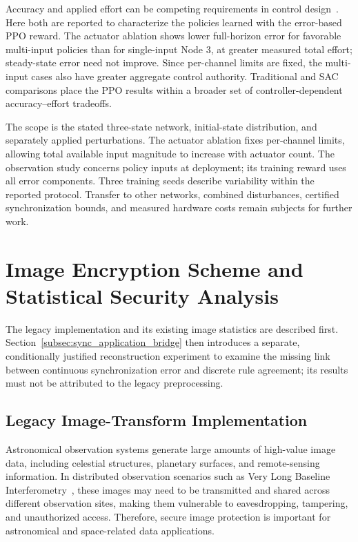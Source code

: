 \documentclass[a4paper,fleqn]{cas-sc}
\theoremstyle{plain}
\theoremstyle{definition}
\begin{document}
Accuracy and applied effort can be competing requirements in control design~\cite{rodriguez2020multiobjective}. Here both are reported to characterize the policies learned with the error-based PPO reward. The actuator ablation shows lower full-horizon error for favorable multi-input policies than for single-input Node 3, at greater measured total effort; steady-state error need not improve. Since per-channel limits are fixed, the multi-input cases also have greater aggregate control authority. Traditional and SAC comparisons place the PPO results within a broader set of controller-dependent accuracy--effort tradeoffs.

The scope is the stated three-state network, initial-state distribution, and separately applied perturbations. The actuator ablation fixes per-channel limits, allowing total available input magnitude to increase with actuator count. The observation study concerns policy inputs at deployment; its training reward uses all error components. Three training seeds describe variability within the reported protocol. Transfer to other networks, combined disturbances, certified synchronization bounds, and measured hardware costs remain subjects for further work.

\FloatBarrier
\section{Image Encryption Scheme and Statistical Security Analysis}
\label{sec:image_encry}

The legacy implementation and its existing image statistics are described first. Section~\ref{subsec:sync_application_bridge} then introduces a separate, conditionally justified reconstruction experiment to examine the missing link between continuous synchronization error and discrete rule agreement; its results must not be attributed to the legacy preprocessing.

\subsection{Legacy Image-Transform Implementation}

Astronomical observation systems generate large amounts of high-value image data, including celestial structures, planetary surfaces, and remote-sensing information. In distributed observation scenarios such as Very Long Baseline Interferometry~\cite{thompson2017interferometry}, these images may need to be transmitted and shared across different observation sites, making them vulnerable to eavesdropping, tampering, and unauthorized access. Therefore, secure image protection is important for astronomical and space-related data applications.
\end{document}
